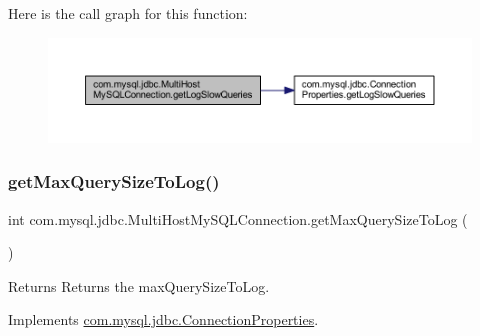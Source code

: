 Here is the call graph for this function\+:
\nopagebreak
\begin{figure}[H]
\begin{center}
\leavevmode
\includegraphics[width=350pt]{classcom_1_1mysql_1_1jdbc_1_1_multi_host_my_s_q_l_connection_afd156080a8f53fbe1f7ff0063f7fa052_cgraph}
\end{center}
\end{figure}
\mbox{\label{classcom_1_1mysql_1_1jdbc_1_1_multi_host_my_s_q_l_connection_a0f63e6682c67051a4e8ed58c16dd50fe}} 
\subsubsection{\texorpdfstring{get\+Max\+Query\+Size\+To\+Log()}{getMaxQuerySizeToLog()}}
{\footnotesize\ttfamily int com.\+mysql.\+jdbc.\+Multi\+Host\+My\+S\+Q\+L\+Connection.\+get\+Max\+Query\+Size\+To\+Log (\begin{DoxyParamCaption}{ }\end{DoxyParamCaption})}

\begin{DoxyReturn}{Returns}
Returns the max\+Query\+Size\+To\+Log. 
\end{DoxyReturn}


Implements \mbox{\hyperlink{interfacecom_1_1mysql_1_1jdbc_1_1_connection_properties_a55edac0ea8c39a11c087948106b3527c}{com.\+mysql.\+jdbc.\+Connection\+Properties}}.


